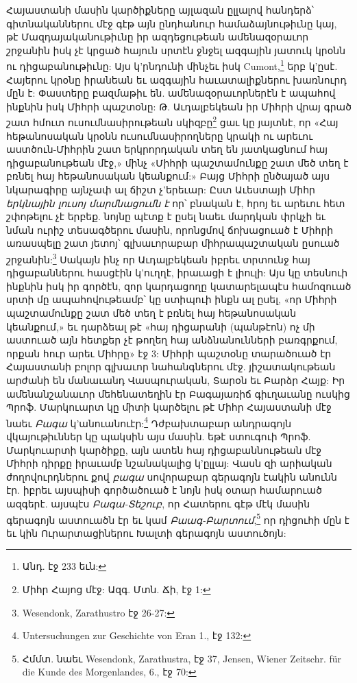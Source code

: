 \documentclass{article}
\begin{document}
{Հայաստանի մասին կարծիքները այլազան ըլլալով հանդերձ՝ գիտնականներու մէջ գէթ այն ընդհանուր համաձայնութիւնը կայ, թէ Մազդայականութիւնը իր ազդեցութեան ամենազօրաւոր շրջանին իսկ չէ կրցած հայուն սրտէն ջնջել ազգային յատուկ կրօնն ու դիցաբանութիւնը: Այս կ'րնդունի մինչեւ իսկ Cumont,\footnote{Անդ. էջ 233 եւն:} երբ կ'ըսէ. Հայերու կրօնը իրանեան եւ ազգային հաւատալիքներու խառնուրդ մըն է: Փաստերը բազմաթիւ են. ամենազօրաւորներէն է ապահով ինքնին իսկ Միհրի պաշտօնը: Թ. Աւդալբեկեան իր Միհրի վրայ գրած շատ հմուտ ուսումնասիրութեան սկիզբը\footnote{Միհր Հայոց մէջ: Ազգ. Մտն. Ճի, էջ 1:} ցաւ կը յայտնէ, որ «Հայ հեթանոսական կրօնն ուսումնասիրողները կրակի ու արեւու աստծուն-Միհրին շատ երկրորդական տեղ են յատկացնում հայ դիցաբանութեան մէջ,» մինչ «Միհրի պաշտամունքը շատ մեծ տեղ է բռնել հայ հեթանոսական կեանքում:» Բայց Միհրի ընծայած այս նկարագիրը այնչափ ալ ճիշտ չ'երեւար: Ըստ Աւեստայի Միհր \emph{երկնային լուսոյ մարմնացումն է} որ՝ բնական է, հրոյ եւ արեւու հետ շփոթելու չէ երբեք. նոյնը պէտք է ըսել նաեւ մարդկան փրկչի եւ նման ուրիշ տեսագծերու մասին, որոնցմով ճոխացուած է Միհրի առասպելը շատ յետոյ՝ գլխաւորաբար միհրապաշտական ըսուած շրջանին:\footnote{Wesendonk, Zarathustro էջ 26-27:} Սակայն ինչ որ Աւդալբեկեան իբրեւ տրտունջ հայ դիցաբաններու հասցէին կ'ուղղէ, իրաւացի է լիուլի: Այս կը տեսնուի ինքնին իսկ իր գործէն, զոր կարդացողը կատարելապէս համոզուած սրտի մը ապահովութեամբ՝ կը ստիպուի ինքն ալ ըսել, «որ Միհրի պաշտամունքը շատ մեծ տեղ է բռնել հայ հեթանոսական կեանքում,» եւ դարձեալ թէ «հայ դիցարանի (պանթէոն) ոչ մի աստուած այն հետքեր չէ թողեղ հայ անձնանունների բառգրքում, որքան հուր արեւ Միհրը» էջ 3: Միհրի պաշտօնը տարածուած էր Հայաստանի բոլոր գլխաւոր նահանգներու մէջ. յիշատակութեան արժանի են մանաւանդ Վասպուրական, Տարօն եւ Բարձր Հայք: Իր ամենանշանաւոր մեհենատեղին էր Բագայառիճ գիւղաւանը ուսկից Պրոֆ. Մարկուարտ կը միտի կարծելու թէ Միհր Հայաստանի մէջ նաեւ \emph{Բագա} կ'անուանուէր:\footnote{Untersuchungen zur Geschichte von Eran 1., էջ 132:} Դժբախտաբար անդրագոյն վկայութիւններ կը պակսին այս մասին. եթէ ստուգուի Պրոֆ. Մարկուարտի կարծիքը, այն ատեն հայ դիցաբաննութեան մէջ Միհրի դիրքը իրաւամբ նշանակալից կ'ըլլայ: Վասն զի արիական ժողովուրդներու քով \emph{բագա} սովորաբար գերագոյն էակին անունն էր. իբրեւ այսպիսի գործածուած է նոյն իսկ օտար համարուած ազգերէ. այսպէս \emph{Բագա-Տեշուբ}, որ Հատերու գէթ մէկ մասին գերագոյն աստուածն էր եւ կամ \emph{Բաագ-Բարտում},\footnote{Հմմտ. նաեւ Wesendonk, Zarathustra, էջ 37, Jensen, Wiener Zeitschr. für die Kunde des Morgenlandes, 6., էջ 70:} որ դիցուհի մըն է եւ կին Ուրարտացիներու Խալտի գերագոյն աստուծոյն:

}
\end{document}
